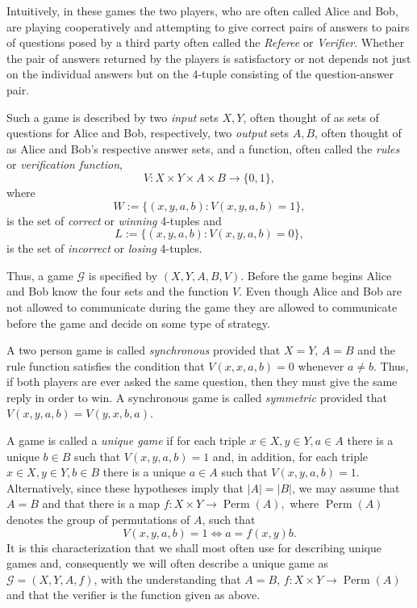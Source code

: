 \documentclass[11pt]{amsart}
\theoremstyle{definition}
\DeclareMathOperator{\Perm}{Perm}
\newcommand{\cl}[1]{\mathcal{#1}}
\begin{document}
 Intuitively, in these games the two players, who are often called Alice and Bob, are playing cooperatively and attempting to give correct pairs of answers to pairs of questions posed by a third party often called the {\it Referee} or {\it Verifier}.
 Whether the pair of answers returned by the players is satisfactory or not depends not just on the individual answers but on the 4-tuple consisting of the question-answer pair.

 Such a game is described by two {\it input} sets $X, Y$, often thought of as sets of questions for Alice and Bob, respectively, two {\it output} sets $A, B$, often thought of as Alice and Bob's respective answer sets,
 and a function, often called the {\it rules} or {\it verification function},
 \[ V: X \times Y \times A \times B \to \{ 0, 1\},\]
 where
 \[W:= \{ (x,y,a,b) : V(x,y,a,b) = 1 \},\]
 is the set of {\it correct} or {\it winning} 4-tuples and
 \[ L:= \{ (x,y,a,b): V(x,y,a,b) =0 \},\]
 is the set of {\it incorrect} or {\it losing} 4-tuples.

 Thus, a game $\cl G$ is specified by $(X, Y, A, B, V)$.
 Before the game begins Alice and Bob know the four sets and the function $V$.
 Even though Alice and Bob are not allowed to communicate during the game they are allowed to communicate before the
 game and decide on some type of strategy.

 A two person game is called {\it synchronous} provided that $X=Y, \, A=B$ and the rule function satisfies the condition that $V(x,x,a,b) =0$ whenever $a \ne b$. Thus, if both players are ever asked the same question, then they must give the same reply in order to win.  A synchronous game is called {\it symmetric} provided that $V(x,y,a,b) = V(y,x,b,a)$.

A  game is called a {\it unique game} if for each triple $x \in X, y \in Y, a \in A$ there is a unique $b \in B$ such that $V(x,y,a,b) =1$ and, in addition, for each triple $x \in X, y \in Y, b \in B$ there is a unique $a \in A$ such that $V(x,y,a,b) =1$. Alternatively, since these hypotheses imply that $|A|=|B|$, we may assume that $A=B$ and that there is a map $f: X \times Y \to \Perm(A),$ where $\Perm(A)$ denotes the group of permutations of $A$, such that
\[ V(x,y,a,b) = 1 \iff a = f(x,y)b.\]
It is this characterization that we shall most often use for describing unique games and, consequently we will often describe a unique game as $\cl G=(X, Y, A, f)$, with the understanding that $A=B$,  $f: X \times Y \to \Perm(A)$ and that the verifier is the function given as above.
\end{document}
